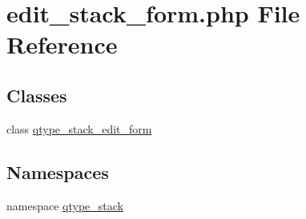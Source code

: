 \hypertarget{edit__stack__form_8php}{
\section{edit\_\-stack\_\-form.php File Reference}
\label{edit__stack__form_8php}
}
\subsection*{Classes}
\begin{DoxyCompactItemize}
\item 
class \hyperlink{classqtype__stack__edit__form}{qtype\_\-stack\_\-edit\_\-form}
\end{DoxyCompactItemize}
\subsection*{Namespaces}
\begin{DoxyCompactItemize}
\item 
namespace \hyperlink{namespaceqtype__stack}{qtype\_\-stack}
\end{DoxyCompactItemize}
